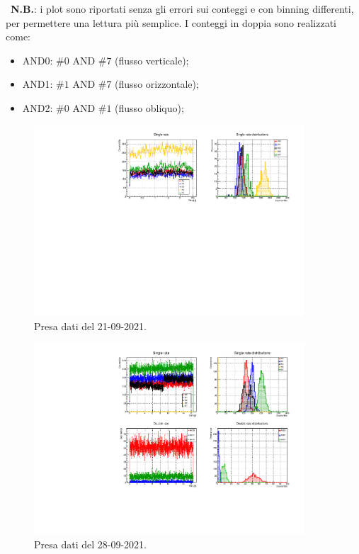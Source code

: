 \documentclass[11pt,a4paper]{article}
\begin{document}
    ~\textbf{N.B.}: i plot sono riportati senza gli errori sui conteggi e con binning differenti, per permettere una lettura più semplice.
    I conteggi in doppia sono realizzati come:

    \begin{itemize}
        \item AND0: $\#0$ AND $\#7$ (flusso verticale);
        \item AND1: $\#1$ AND $\#7$ (flusso orizzontale);
        \item AND2: $\#0$ AND $\#1$ (flusso obliquo);
    \end{itemize}

    \begin{figure}
        \includegraphics[width=0.9\textwidth]{Immagini/20210921}
        \caption{Presa dati del 21-09-2021.}
    \end{figure}

    \begin{figure}
        \includegraphics[width=0.9\textwidth]{Immagini/20210928}
        \caption{Presa dati del 28-09-2021.}
    \end{figure}
\end{document}

